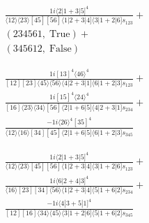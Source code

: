 \documentclass[varwidth, border=5pt]{standalone}
\begin{document}
\begin{my}
$\begin{gathered}
\scriptscriptstyle\frac{1i⟨2|1+3|5]^4}{⟨12⟩⟨23⟩[45][56]⟨1|2+3|4]⟨3|1+2|6]s_{123}}+\\
\scriptscriptstyle(234561,\;\text{True})+\\
\scriptscriptstyle(345612,\;\text{False})\phantom{+}
\end{gathered}$
\end{my}
\begin{my}
$\begin{gathered}
\scriptscriptstyle\frac{1i[13]^4⟨46⟩^4}{[12][23]⟨45⟩⟨56⟩⟨4|2+3|1]⟨6|1+2|3]s_{123}}+\\
\scriptscriptstyle\frac{1i[15]^4⟨24⟩^4}{[16]⟨23⟩⟨34⟩[56]⟨2|1+6|5]⟨4|2+3|1]s_{234}}+\\
\scriptscriptstyle\frac{-1i⟨26⟩^4[35]^4}{⟨12⟩⟨16⟩[34][45]⟨2|1+6|5]⟨6|1+2|3]s_{345}}\phantom{+}
\end{gathered}$
\end{my}
\begin{my}
$\begin{gathered}
\scriptscriptstyle\frac{1i⟨2|1+3|5]^4}{⟨12⟩⟨23⟩[45][56]⟨1|2+3|4]⟨3|1+2|6]s_{123}}+\\
\scriptscriptstyle\frac{1i⟨6|2+4|3]^4}{⟨16⟩[23][34]⟨56⟩⟨1|2+3|4]⟨5|1+6|2]s_{234}}+\\
\scriptscriptstyle\frac{-1i⟨4|3+5|1]^4}{[12][16]⟨34⟩⟨45⟩⟨3|1+2|6]⟨5|1+6|2]s_{345}}\phantom{+}
\end{gathered}$
\end{my}
\end{document}

